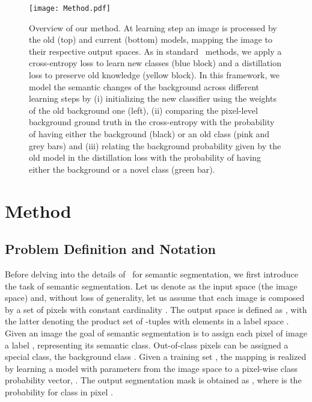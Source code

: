 \begin{figure*}
    \centering
    \texttt{[image: Method.pdf]}
    \vspace{-10pt}
    \caption{Overview of our 
method. 
At learning step  an image is processed by the old (top) and current (bottom) models, mapping the image to their respective output spaces. As in standard \icl\ methods, we apply a cross-entropy loss to learn new classes (blue block) and a distillation loss to preserve old knowledge (yellow block). In this framework, we model the semantic changes of the background 
 across different learning steps by (i) initializing the new classifier using the weights of the old background one (left), (ii) comparing the pixel-level background ground truth in the cross-entropy with the probability of having either the background (black) or an old class (pink and grey bars) and (iii) relating the background probability given by the old model in the distillation loss with the probability of having either the background or a novel class (green bar).  \vspace{-10pt}}
    \label{fig:method}
\end{figure*}
 
\section{Method}
\label{sec:method}


\subsection{Problem Definition and Notation}
\label{sec:problem}


Before delving into the details of \icl\ for semantic segmentation, we first introduce the task of semantic segmentation.
Let us denote as  the input space (\ie the image space) and, without loss of generality, let us assume that each image  is composed by a set of pixels  with constant cardinality . The output space is defined as , with the latter denoting the product set of -tuples with elements in a label space . Given an image  the goal of semantic segmentation is to assign each pixel  of image  a label , representing its semantic class. Out-of-class pixels can be assigned a special class, \ie the background class . 
{Given a training set , the mapping is realized by learning a model  with parameters  from the image space  to a pixel-wise class probability vector, \ie .
The output segmentation mask is obtained as , where  is the probability for class  in pixel .}

